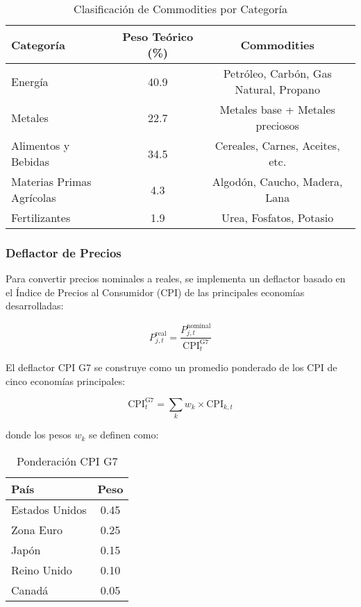 \documentclass[12pt,a4paper]{article}
\begin{document}
\begin{table}[H]
\centering
\caption{Clasificación de Commodities por Categoría}
\begin{tabular}{lcc}
\toprule
\textbf{Categoría} & \textbf{Peso Teórico (\%)} & \textbf{Commodities} \\
\midrule
Energía & 40.9 & Petróleo, Carbón, Gas Natural, Propano \\
Metales & 22.7 & Metales base + Metales preciosos \\
Alimentos y Bebidas & 34.5 & Cereales, Carnes, Aceites, etc. \\
Materias Primas Agrícolas & 4.3 & Algodón, Caucho, Madera, Lana \\
Fertilizantes & 1.9 & Urea, Fosfatos, Potasio \\
\bottomrule
\end{tabular}
\label{tab:commodities}
\end{table}

\subsubsection{Deflactor de Precios}
Para convertir precios nominales a reales, se implementa un deflactor basado en el Índice de Precios al Consumidor (CPI) de las principales economías desarrolladas:

\begin{equation}
P^{\text{real}}_{j,t} = \frac{P^{\text{nominal}}_{j,t}}{\text{CPI}_{t}^{\text{G7}}}
\label{eq:deflator}
\end{equation}

El deflactor CPI G7 se construye como un promedio ponderado de los CPI de cinco economías principales:

\begin{equation}
\text{CPI}_{t}^{\text{G7}} = \sum_{k} w_k \times \text{CPI}_{k,t}
\label{eq:cpi_g7}
\end{equation}

donde los pesos $w_k$ se definen como:

\begin{table}[H]
\centering
\caption{Ponderación CPI G7}
\begin{tabular}{lc}
\toprule
\textbf{País} & \textbf{Peso} \\
\midrule
Estados Unidos & 0.45 \\
Zona Euro & 0.25 \\
Japón & 0.15 \\
Reino Unido & 0.10 \\
Canadá & 0.05 \\
\bottomrule
\end{tabular}
\label{tab:cpi_weights}
\end{table}
\end{document}
